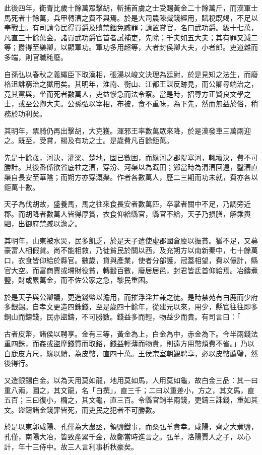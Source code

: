 \begin{pinyinscope}
此後四年，衛青比歲十餘萬眾擊胡，斬捕首虜之士受賜黃金二十餘萬斤，而漢軍士馬死者十餘萬，兵甲轉漕之費不與焉。於是大司農陳臧錢經用，賦稅既竭，不足以奉戰士。有司請令民得買爵及贖禁錮免臧罪；請置賞官，名曰武功爵。級十七萬，凡直三十餘萬金。諸買武功爵官首者試補吏，先除；千夫如五大夫；其有罪又減二等；爵得至樂卿，以顯軍功。軍功多用超等，大者封侯卿大夫，小者郎。吏道雜而多端，則官職秏廢。

自孫弘以春秋之義繩臣下取漢相，張湯以峻文決理為廷尉，於是見知之法生，而廢格沮誹窮治之獄用矣。其明年，淮南、衡山、江都王謀反跡見，而公卿尋端治之，竟其黨與，坐而死者數萬人，吏益慘急而法令察。當是時，招尊方正賢良文學之士，或至公卿大夫。公孫弘以宰相，布被，食不重味，為下先，然而無益於俗，稍務於功利矣。

其明年，票騎仍再出擊胡，大克獲。渾邪王率數萬眾來降，於是漢發車三萬兩迎之。既至，受賞，賜及有功之士。是歲費凡百餘鉅萬。

先是十餘歲，河決，灌梁、楚地，固已數困，而緣河之郡隄塞河，輒壞決，費不可勝計。其後番係欲省底柱之漕，穿汾、河渠以為溉田；鄭當時為渭漕回遠，鑿漕直渠自長安至華陰；而朔方亦穿溉渠。作者各數萬人，歷二三期而功未就，費亦各以鉅萬十數。

天子為伐胡故，盛養馬，馬之往來食長安者數萬匹，卒掌者關中不足，乃調旁近郡。而胡降者數萬人皆得厚賞，衣食仰給縣官，縣官不給，天子乃損膳，解乘輿駟，出御府禁臧以澹之。

其明年，山東被水災，民多飢乏，於是天子遣使虛郡國倉廩以振貧。猶不足，又募豪富人相假貸。尚不能相救，乃徙貧民於關以西，及充朔方以南新秦中，七十餘萬口，衣食皆仰給於縣官。數歲，貸與產業，使者分部護，冠蓋相望，費以億計，縣官大空。而富商賈或墆財役貧，轉轂百數，廢居居邑，封君皆氐首仰給焉。冶鑄煮鹽，財或累萬金，而不佐公家之急，黎民重困。

於是天子與公卿議，更造錢幣以澹用，而摧浮淫并兼之徒。是時禁苑有白鹿而少府多銀錫。自孝文更造四銖錢，至是歲四十餘年，從建元以來，用少，縣官往往即多銅山而鑄錢，民亦盜鑄，不可勝數。錢益多而輕，物益少而貴。有司言曰：「

古者皮幣，諸侯以聘享。金有三等，黃金為上，白金為中，赤金為下。今半兩錢法重四銖，而姦或盜摩錢質而取鋊，錢益輕薄而物貴，則遠方用幣煩費不省。」乃以白鹿皮方尺，緣以繢，為皮幣，直四十萬。王侯宗室朝覲聘享，必以皮幣薦璧，然後得行。

又造銀錫白金。以為天用莫如龍，地用莫如馬，人用莫如龜，故白金三品：其一曰重八兩，圜之，其文龍，名「白撰」，直三千；二曰以重差小，方之，其文馬，直五百；三曰復小，橢之，其文龜，直三百。令縣官銷半兩錢，更鑄三誅錢，重如其文。盜鑄諸金錢罪皆死，而吏民之犯者不可勝數。

於是以東郭咸陽、孔僅為大農丞，領鹽鐵事，而桑弘羊貴幸。咸陽，齊之大煮鹽，孔僅，南陽大冶，皆致產累千金，故鄭當時進言之。弘羊，洛陽賈人之子，以心計，年十三侍中。故三人言利事析秋豪矣。


\end{pinyinscope}
